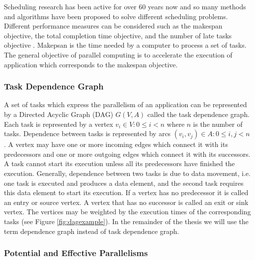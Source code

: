 Scheduling research has been active for over 60 years now and so many methods and algorithms have been proposed to solve different scheduling problems. Different performance measures can be considered such as the makespan objective, the total completion time objective, and the number of late tasks objective \cite{leung:2004}. Makepsan is the time needed by a computer to process a set of tasks. The general objective of parallel computing is to accelerate the execution of application which corresponds to the makespan objective.

\subsubsection{Task Dependence Graph}

A set of tasks which express the parallelism of an application can be represented by a Directed Acyclic Graph (DAG) $G(V,A)$ called the task dependence graph. Each task is represented by a vertex $v_i \in V: 0 \leq i < n$ where $n$ is the number of tasks. Dependence between tasks is represented by arcs $(v_i, v_j) \in A: 0 \leq i,j < n$. A vertex may have one or more incoming edges which connect it with its predecessors and one or more outgoing edges which connect it with its successors. A task cannot start its execution unless all its predecessors have finished the execution. Generally, dependence between two tasks is due to data movement, i.e. one task is executed and produces a data element, and the second task requires this data element to start its execution. If a vertex has no predecessor it is called an entry or source vertex. A vertex that has no successor is called an exit or sink vertex. The vertices may be weighted by the execution times of the corresponding tasks (see Figure \ref{fig:dagexample}). In the remainder of the thesis we will use the term dependence graph instead of task dependence graph.


\subsubsection{Potential and Effective Parallelisms}

